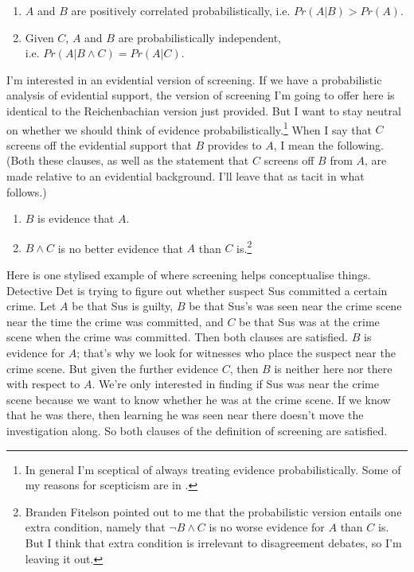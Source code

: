 \begin{enumerate}
\item \(A\) and \(B\) are positively correlated probabilistically, i.e. \(Pr(A | B) > Pr(A)\).
\item  Given \(C\), \(A\) and \(B\) are probabilistically independent, \\ i.e. \(Pr(A | B \wedge C) = Pr(A | C)\).
\end{enumerate}

\noindent I'm interested in an evidential version of screening. If we have a probabilistic analysis of evidential support, the version of screening I'm going to offer here is identical to the Reichenbachian version just provided. But I want to stay neutral on whether we should think of evidence probabilistically.\footnote{In general I'm sceptical of always treating evidence probabilistically. Some of my reasons for scepticism are in \citet{Weatherson2007}.} When I say that \(C\) screens off the evidential support that \(B\) provides to \(A\), I mean the following. (Both these clauses, as well as the statement that \(C\) screens off \(B\) from \(A\), are made relative to an evidential background. I'll leave that as tacit in what follows.)

\begin{enumerate}
\item \(B\) is evidence that \(A\).
\item  \(B \wedge C\) is no better evidence that \(A\) than \(C\) is.\footnote{Branden Fitelson pointed out to me that the probabilistic version entails one extra condition, namely that  \(\neg B \wedge C\) is no worse evidence for \(A\) than \(C\) is. But I think that extra condition is irrelevant to disagreement debates, so I'm leaving it out.}
\end{enumerate}

\noindent Here is one stylised example of where screening helps conceptualise things. Detective Det is trying to figure out whether suspect Sus committed a certain crime. Let \(A\) be that Sus is guilty, \(B\) be that Sus's was seen near the crime scene near the time the crime was committed, and \(C\) be that Sus was at the crime scene when the crime was committed. Then both clauses are satisfied. \(B\) is evidence for \(A\); that's why we look for witnesses who place the suspect near the crime scene. But given the further evidence \(C\), then \(B\) is neither here nor there with respect to \(A\). We're only interested in finding if Sus was near the crime scene because we want to know whether he was at the crime scene. If we know that he was there, then learning he was seen near there doesn't move the investigation along. So both clauses of the definition of screening are satisfied.

